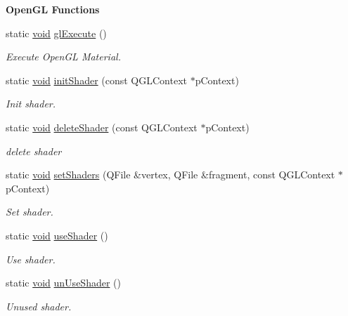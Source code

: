 \begin{Indent}{\bf Open\-G\-L Functions}\par
\begin{DoxyCompactItemize}
\item 
static \hyperlink{group___u_a_v_objects_plugin_ga444cf2ff3f0ecbe028adce838d373f5c}{void} \hyperlink{class_g_l_c___selection_material_ac656b32254c356107c451e6501826017}{gl\-Execute} ()
\begin{DoxyCompactList}\small\item\em Execute Open\-G\-L Material. \end{DoxyCompactList}\item 
static \hyperlink{group___u_a_v_objects_plugin_ga444cf2ff3f0ecbe028adce838d373f5c}{void} \hyperlink{class_g_l_c___selection_material_afd75b0f11e07901fab7eddd8ccac0f35}{init\-Shader} (const Q\-G\-L\-Context $\ast$p\-Context)
\begin{DoxyCompactList}\small\item\em Init shader. \end{DoxyCompactList}\item 
static \hyperlink{group___u_a_v_objects_plugin_ga444cf2ff3f0ecbe028adce838d373f5c}{void} \hyperlink{class_g_l_c___selection_material_a4d30e148cedc1d72d77a210b9d835cbc}{delete\-Shader} (const Q\-G\-L\-Context $\ast$p\-Context)
\begin{DoxyCompactList}\small\item\em delete shader \end{DoxyCompactList}\item 
static \hyperlink{group___u_a_v_objects_plugin_ga444cf2ff3f0ecbe028adce838d373f5c}{void} \hyperlink{class_g_l_c___selection_material_a7fd2df5eac5ed6583a2f8d01e376e0d8}{set\-Shaders} (Q\-File \&vertex, Q\-File \&fragment, const Q\-G\-L\-Context $\ast$p\-Context)
\begin{DoxyCompactList}\small\item\em Set shader. \end{DoxyCompactList}\item 
static \hyperlink{group___u_a_v_objects_plugin_ga444cf2ff3f0ecbe028adce838d373f5c}{void} \hyperlink{class_g_l_c___selection_material_a05043946e15cca955845e9346763440b}{use\-Shader} ()
\begin{DoxyCompactList}\small\item\em Use shader. \end{DoxyCompactList}\item 
static \hyperlink{group___u_a_v_objects_plugin_ga444cf2ff3f0ecbe028adce838d373f5c}{void} \hyperlink{class_g_l_c___selection_material_a1c303a1a73c4ff4fbf243febf3d7bf3e}{un\-Use\-Shader} ()
\begin{DoxyCompactList}\small\item\em Unused shader. \end{DoxyCompactList}\end{DoxyCompactItemize}
\end{Indent}


